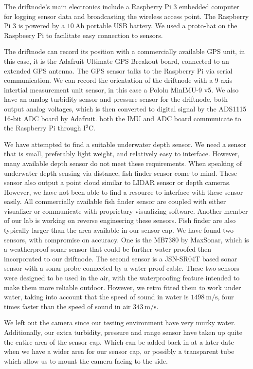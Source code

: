 The driftnode's main electronics include a Raspberry Pi 3 embedded computer for logging sensor data and broadcasting the wireless access point.
The Raspberry Pi 3 is powered by a $\SI{10}{\ampere\hour}$ portable USB battery.
We used a proto-hat on the Raspbeery Pi to facilitate easy connection to sensors.

The driftnode can record its position with a commercially available GPS unit, in this case, it is the Adafruit Ultimate GPS Breakout board, connected to an extended GPS antenna.
The GPS sensor talks to the Raspberry Pi via serial communication.
We can record the orientation of the driftnode with a 9-axis intertial measurement unit sensor, in this case a Pololu MinIMU-9 v5.
We also have an analog turbidity sensor and pressure sensor for the driftnode, both output analog voltages, which is then converted to digital signal by the ADS1115 16-bit ADC board by Adafruit.
both the IMU and ADC board communicate to the Raspberry Pi through I$^{2}$C.

We have attempted to find a suitable underwater depth sensor.
We need a sensor that is small, preferably light weight, and relatively easy to interface.
However, many available depth sensor do not meet these requirements.
When speaking of underwater depth sensing via distance, fish finder sensor come to mind.
These sensor also output a point cloud similar to LIDAR sensor or depth cameras.
However, we have not been able to find a resource to interface with these sensor easily.
All commercially available fish finder sensor are coupled with either visualizer or communicate with proprietary visualizing software.
Another member of our lab is working on reverse engineering these sensors.
Fish finder are also typically larger than the area available in our sensor cap.
We have found two sensors, with compromise on accuracy.
One is the MB7380 by MaxSonar, which is a weatherproof sonar sensor that could be further water proofed then incorporated to our driftnode.
The second sensor is a JSN-SR04T based sonar sensor with a sonar probe connected by a water proof cable.
These two sensors were designed to be used in the air, with the waterproofing feature intended to make them more reliable outdoor.
However, we retro fitted them to work under water, taking into account that the speed of sound in water is $\SI{1498}{\metre/\second}$, four times faster than the speed of sound in air $\SI{343}{\metre/\second}$.

We left out the camera since our testing environment have very murky water.
Additionally, our extra turbidity, pressure and range sensor have taken up quite the entire area of the sensor cap.
Which can be added back in at a later date when we have a wider area for our sensor cap, or possibly a transparent tube which allow us to mount the camera facing to the side.

